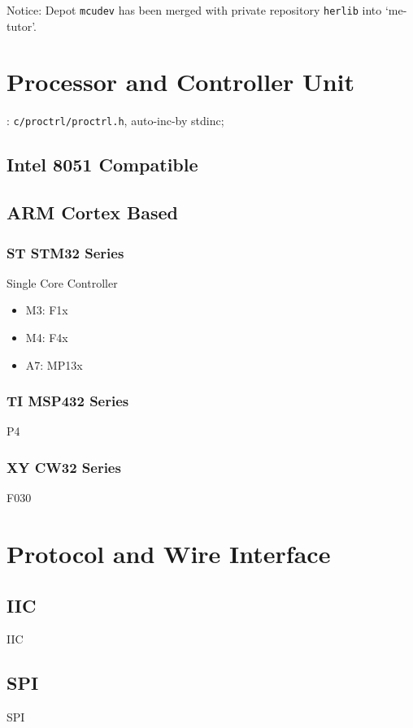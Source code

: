 Notice: Depot \verb`mcudev` has been merged with private repository \verb`herlib` into `me-tutor'.

\section{Processor and Controller Unit}
:
\verb`c/proctrl/proctrl.h`, auto-inc-by stdinc;


\subsection{Intel 8051 Compatible}

\subsection{ARM Cortex Based}

\subsubsection{ST STM32 Series}

Single Core Controller

\begin{itemize}
\item M3: F1x
\item M4: F4x
\item A7: MP13x
\end{itemize}

\subsubsection{TI MSP432 Series}

P4

\subsubsection{XY CW32 Series}

F030

\section{Protocol and Wire Interface}

\subsection{IIC}
{IIC}

\subsection{SPI}
{SPI}

